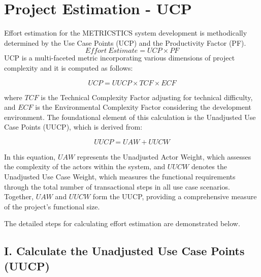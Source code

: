 \documentclass[english,12pt,a4paper]{report}
\begin{document}
	\section{Project Estimation - UCP}
	Effort estimation for the METRICSTICS system development is methodically determined by the Use Case Points (UCP) and  the Productivity Factor (PF).
	\begin{equation}
		Effort\ Estimate = UCP \times PF
	\end{equation} 
	UCP is a multi-faceted metric incorporating various dimensions of project complexity and it is computed as follows:
	
	\begin{equation}
		UCP = UUCP \times TCF \times ECF
	\end{equation}
	
	\begin{flushleft}
	where \( TCF \) is the Technical Complexity Factor adjusting for technical difficulty, and \( ECF \) is the Environmental Complexity Factor considering the development environment. The foundational element of this calculation is the Unadjusted Use Case Points (UUCP), which is derived from:
	
	\begin{equation}
		UUCP = UAW + UUCW
	\end{equation}
	
	In this equation, \( UAW \) represents the Unadjusted Actor Weight, which assesses the complexity of the actors within the system, and \( UUCW \) denotes the Unadjusted Use Case Weight, which measures the functional requirements through the total number of transactional steps in all use case scenarios. Together, \( UAW \) and \( UUCW \) form the UUCP, providing a comprehensive measure of the project's functional size.
	\end{flushleft}
	
	\begin{flushleft}
	The detailed steps for calculating effort estimation are demonstrated below.
	\end{flushleft}
	
		\subsection*{I. Calculate the Unadjusted Use Case Points (UUCP)}
		
\end{document}
